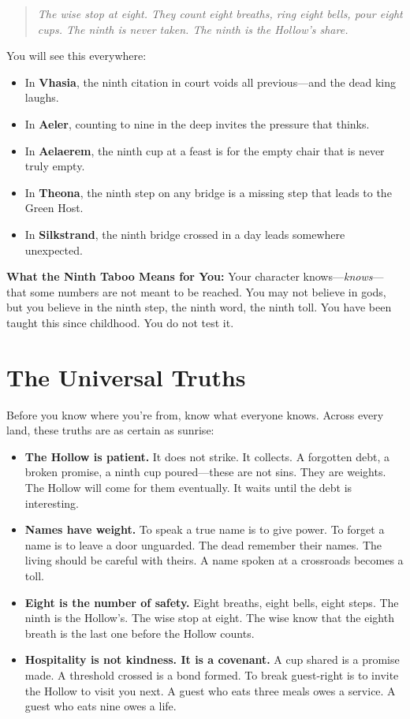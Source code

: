 \documentclass[10pt]{article}
\begin{document}
\begin{quote}
\itshape
The wise stop at eight. They count eight breaths, ring eight bells, pour eight cups. 
The ninth is never taken. The ninth is the Hollow's share.
\end{quote}

You will see this everywhere:
\begin{itemize}
\item In \textbf{Vhasia}, the ninth citation in court voids all previous---and the dead king laughs.
\item In \textbf{Aeler}, counting to nine in the deep invites the pressure that thinks.
\item In \textbf{Aelaerem}, the ninth cup at a feast is for the empty chair that is never truly empty.
\item In \textbf{Theona}, the ninth step on any bridge is a missing step that leads to the Green Host.
\item In \textbf{Silkstrand}, the ninth bridge crossed in a day leads somewhere unexpected.
\end{itemize}

\textbf{What the Ninth Taboo Means for You:} Your character knows---\emph{knows}---that some 
numbers are not meant to be reached. You may not believe in gods, but you believe in the 
ninth step, the ninth word, the ninth toll. You have been taught this since childhood. 
You do not test it.

\section*{The Universal Truths}

Before you know where you're from, know what everyone knows. Across every land, these 
truths are as certain as sunrise:

\begin{itemize}
\item \textbf{The Hollow is patient.} It does not strike. It collects. A forgotten debt, a broken promise, a ninth cup poured—these are not sins. They are weights. The Hollow will come for them eventually. It waits until the debt is interesting.

\item \textbf{Names have weight.} To speak a true name is to give power. To forget a name is to leave a door unguarded. The dead remember their names. The living should be careful with theirs. A name spoken at a crossroads becomes a toll.

\item \textbf{Eight is the number of safety.} Eight breaths, eight bells, eight steps. The ninth is the Hollow's. The wise stop at eight. The wise know that the eighth breath is the last one before the Hollow counts.

\item \textbf{Hospitality is not kindness. It is a covenant.} A cup shared is a promise made. A threshold crossed is a bond formed. To break guest-right is to invite the Hollow to visit you next. A guest who eats three meals owes a service. A guest who eats nine owes a life.
\end{itemize}
\end{document}
